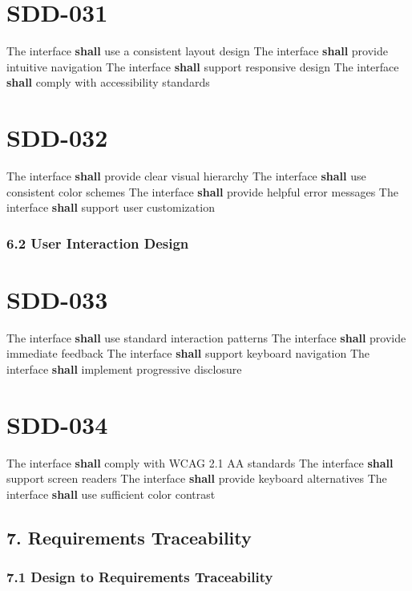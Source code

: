 \section{SDD-031}\label{SDD-031}

The interface \textbf{shall} use a consistent layout design
The interface \textbf{shall} provide intuitive navigation
The interface \textbf{shall} support responsive design
The interface \textbf{shall} comply with accessibility standards

\section{SDD-032}\label{SDD-032}

The interface \textbf{shall} provide clear visual hierarchy
The interface \textbf{shall} use consistent color schemes
The interface \textbf{shall} provide helpful error messages
The interface \textbf{shall} support user customization

\subsubsection{6.2 User Interaction Design}

\section{SDD-033}\label{SDD-033}

The interface \textbf{shall} use standard interaction patterns
The interface \textbf{shall} provide immediate feedback
The interface \textbf{shall} support keyboard navigation
The interface \textbf{shall} implement progressive disclosure

\section{SDD-034}\label{SDD-034}

The interface \textbf{shall} comply with WCAG 2.1 AA standards
The interface \textbf{shall} support screen readers
The interface \textbf{shall} provide keyboard alternatives
The interface \textbf{shall} use sufficient color contrast

\subsection{7. Requirements Traceability}

\subsubsection{7.1 Design to Requirements Traceability}

